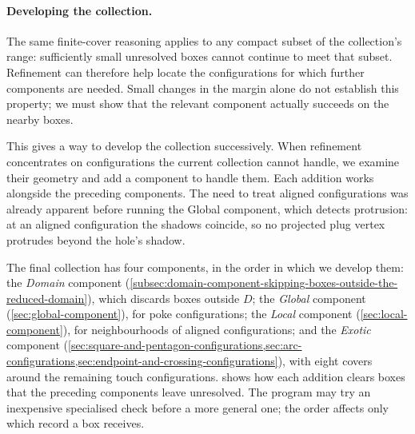 \paragraph{Developing the collection.}
The same finite-cover reasoning applies to any compact subset of the
collection's range: sufficiently small unresolved boxes cannot continue
to meet that subset. Refinement can therefore help locate the configurations
for which further components are needed. Small changes in the margin alone
do not establish this property; we must show that the relevant component
actually succeeds on the nearby boxes.

This gives a way to develop the collection successively. When refinement
concentrates on configurations the current collection cannot handle, we
examine their geometry and add a component to handle them. Each addition works
alongside the preceding components. The need to treat aligned configurations
was already apparent before running the Global component, which detects
protrusion: at an aligned configuration the shadows coincide, so no
projected plug vertex protrudes beyond the hole's shadow.

The final collection has four components, in the order in which we develop
them: the \emph{Domain} component (\cref{subsec:domain-component-skipping-boxes-outside-the-reduced-domain}),
which discards boxes outside $D$; the \emph{Global} component
(\cref{sec:global-component}), for poke configurations; the \emph{Local}
component (\cref{sec:local-component}), for neighbourhoods of aligned
configurations; and the \emph{Exotic} component
(\cref{sec:square-and-pentagon-configurations,sec:arc-configurations,sec:endpoint-and-crossing-configurations}),
with eight covers around the remaining touch configurations.
 shows how each addition clears boxes that the
preceding components leave unresolved. The program may try an inexpensive
specialised check before a more general one; the order affects only which
record a box receives.

